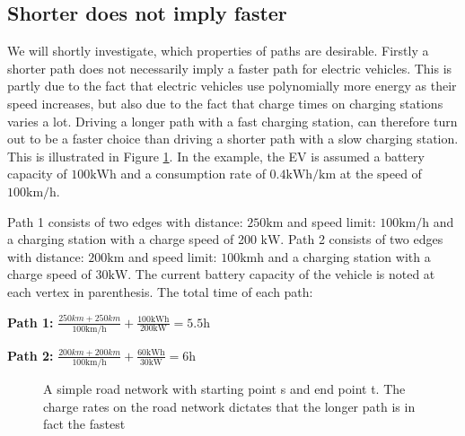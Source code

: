 \subsection{Shorter does not imply faster}
\label{sec:shorternotfaster}
We will shortly investigate, which properties of paths are desirable. Firstly a shorter path does not necessarily imply a faster path for electric vehicles. This is partly due to the fact that electric vehicles use polynomially more energy as their speed increases, but also due to the fact that charge times on charging stations varies a lot. Driving a longer path with a fast charging station, can therefore turn out to be a faster choice than driving a shorter path with a slow charging station. This is illustrated in Figure \ref{fig:simpleroad-network}. In the example, the EV is assumed a battery capacity of $100 \si{\kWh}$ and a consumption rate of $0.4\si{\kWh\per\km}$ at the speed of $100 \si{\km\per\hour}$.

Path 1 consists of two edges with distance: $ 250 \si{\km}$ and speed limit: $100 \si{\km\per\hour}$
and a charging station with a charge speed of 200 $\si{\kW}$. Path 2 consists of two edges with distance: $200 \si{\km}$ and speed limit: $100 \si{\km\hour}$ and a charging station with a charge speed of $30\si{\kW}$. The current battery capacity of the vehicle is noted at each vertex in parenthesis. The total time of each path:
				
\textbf{Path 1:} $\frac{250\si{km} + 250\si{km}}{100\si{\km\per\hour}} + \frac{100\si{\kWh}}{200\si{\kW}} = 5.5\si{\hour}$

\textbf{Path 2:} $\frac{200\si{km} + 200\si{km}}{100 \si{\km\per\hour}} + \frac{60\si{\kWh}}{30\si{\kW}} = 6\si{\hour}$


\begin{figure}
\centering
{}
\label{fig:simpleroad-network}
\caption{A simple road network with starting point s and end point t. The charge rates on the road network dictates that the longer path is in fact the fastest}
\end{figure}
